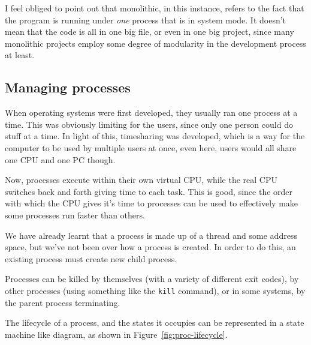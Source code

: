 
I feel obliged to point out that monolithic, in this instance, refers to the
fact that the program is running under \textit{one} process that is in system
mode. It doesn't mean that the code is all in one big file, or even in one big
project, since many monolithic projects employ some degree of modularity in
the development process at least.

\subsection{Managing processes}

When operating systems were first developed, they usually ran one process at a
time. This was obviously limiting for the users, since only one person could do
stuff at a time. In light of this, timesharing was developed, which is a way for
the computer to be used by multiple users at once, even here, users would all
share one CPU and one PC though.

Now, processes execute within their own virtual CPU, while the real CPU switches
back and forth giving time to each task. This is good, since the order with
which the CPU gives it's time to processes can be used to effectively make some
processes run faster than others.

We have already learnt that a process is made up of a thread and some address
space,  but we've not been over how a process is
created. In order to do this, an existing process must create new child process.

Processes can be killed by themselves (with a variety of different exit codes),
by other processes (using something like the \texttt{kill} command), or in some
systems, by the parent process terminating.

The lifecycle of a process, and the states it occupies can be represented in a
state machine like diagram, as shown in Figure~\ref{fig:proc-lifecycle}.

